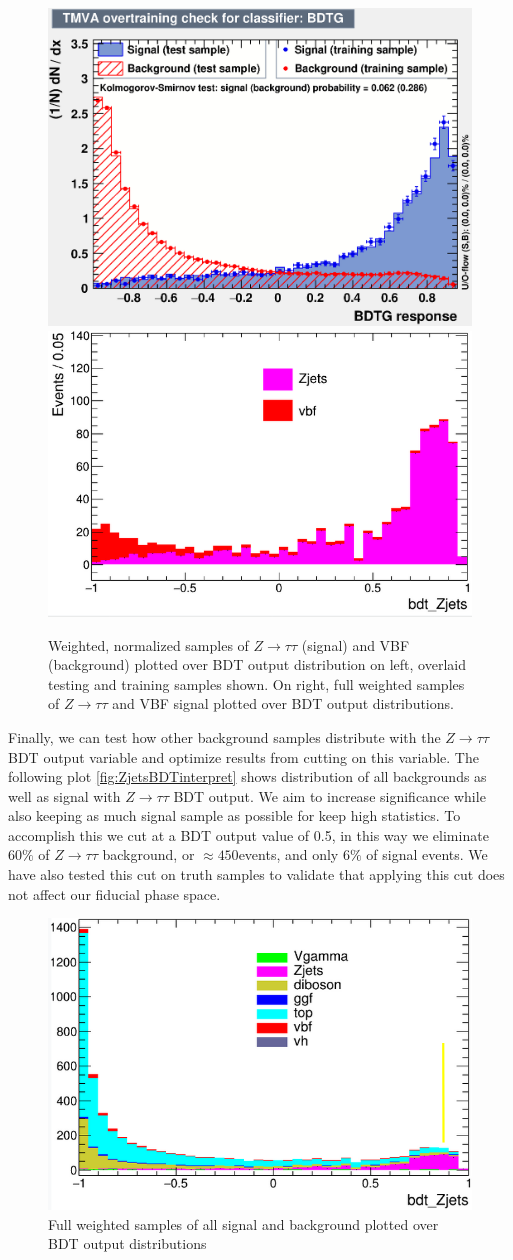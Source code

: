 \begin{figure}[!htbp]
\centering
  \includegraphics[width=.4\linewidth]{Pictures/overtrain_BDTG.eps}
  \includegraphics[width=.4\linewidth]{Pictures/weightedZjetsVBF.png}
\caption{Weighted, normalized samples of $Z\rightarrow\tau\tau$ (signal) and VBF (background) plotted over BDT output distribution on left, overlaid testing and training samples shown. On right, full weighted samples of $Z\rightarrow\tau\tau$ and VBF signal plotted over BDT output distributions.}
\label{fig:ZjetsBDTresult}
\end{figure}

Finally, we can test how other background samples distribute with the $Z\rightarrow\tau\tau$ BDT output variable and optimize results from cutting on this variable. The following plot \ref{fig:ZjetsBDTinterpret} shows distribution of all backgrounds as well as signal with $Z\rightarrow\tau\tau$ BDT output. We aim to increase significance while also keeping as much signal sample as possible for keep high statistics. To accomplish this we cut at a BDT output value of 0.5, in this way we eliminate $60\%$ of $Z\rightarrow\tau\tau$ background, or $\approx 450$events, and only $6\%$ of signal events. We have also tested this cut on truth samples to validate that applying this cut does not affect our fiducial phase space. 
\begin{figure}[!htbp]
\centering
\includegraphics[width=.4\linewidth]{Pictures/weightedZjetsAll.png}
\caption{Full weighted samples of all signal and background plotted over BDT output distributions}
\label{fig:ZjetsBDTintepret}
\end{figure}

